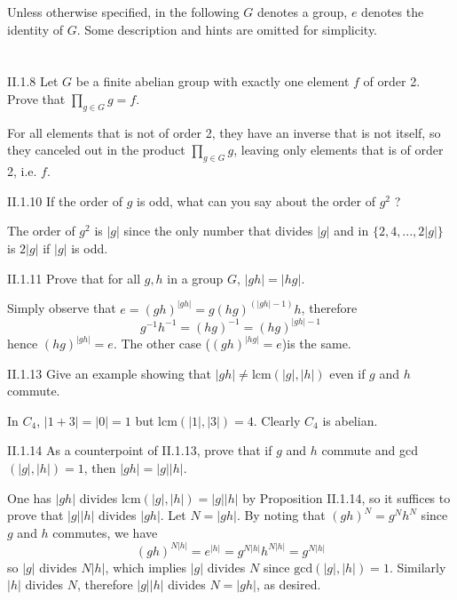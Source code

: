 Unless otherwise specified, in the following $G$ denotes a group, $e$ denotes the identity of $G$. Some description and hints are omitted for simplicity.

\section{}

\begin{problem}{II.1.8}
Let $G$ be a finite abelian group with exactly one element $f$ of order 2. Prove that $\prod_{g \in G}g = f.$
\end{problem}
\begin{pf}
For all elements that is not of order 2, they have an inverse that is not itself, so they canceled out in the product $\prod_{g \in G}g$, leaving only elements that is of order 2, i.e. $f$.
\end{pf}

\begin{problem}{II.1.10}
If the order of $g$ is odd, what can you say about the order of $g^2$ ?
\end{problem}
\begin{sol}
The order of $g^2$ is $|g|$ since the only number that divides $|g|$ and in $\{2, 4, ..., 2|g|\}$ is $2|g|$ if $|g|$ is odd.
\end{sol}

\begin{problem}{II.1.11}
Prove that for all $g, h$ in a group $G$, $|gh| = |hg|$.
\end{problem}
\begin{pf}
Simply observe that $e = (gh)^{|gh|} = g(hg)^{(|gh|-1)}h$, therefore 
\[
g^{-1}h^{-1} = (hg)^{-1} = (hg)^{|gh|-1}
\]
hence $(hg)^{|gh|} = e$. The other case ($(gh)^{|hg|} = e$)is the same.
\end{pf}

\begin{problem}{II.1.13}
Give an example showing that $|gh| \neq \text{lcm}(|g|, |h|)$ even if $g$ and $h$ commute.
\end{problem}
\begin{sol}
In $C_4$, $|1 + 3| = |0| = 1$ but $\text{lcm}(|1|, |3|) = 4$. Clearly $C_4$ is abelian.
\end{sol}

\begin{problem}{II.1.14}
As a counterpoint of II.1.13, prove that if $g$ and $h$ commute and gcd$(|g|, |h|) = 1$, then $|gh| = |g||h|$. 
\end{problem}
\begin{pf}
One has $|gh|$ divides $\text{lcm}(|g|, |h|) = |g||h|$ by Proposition II.1.14, so it suffices to prove that $|g||h|$ divides $|gh|$. Let $N = |gh|$. By noting that $(gh)^N = g^Nh^N$ since $g$ and $h$ commutes, we have
\[
(gh)^{N|h|} = e^{|h|} = g^{N|h|}h^{N|h|} = g^{N|h|}
\]
so $|g|$ divides $N|h|$, which implies $|g|$ divides $N$ since $\text{gcd}(|g|, |h|) = 1$. Similarly $|h|$ divides $N$, therefore $|g||h|$ divides $N = |gh|$, as desired.
\end{pf}

